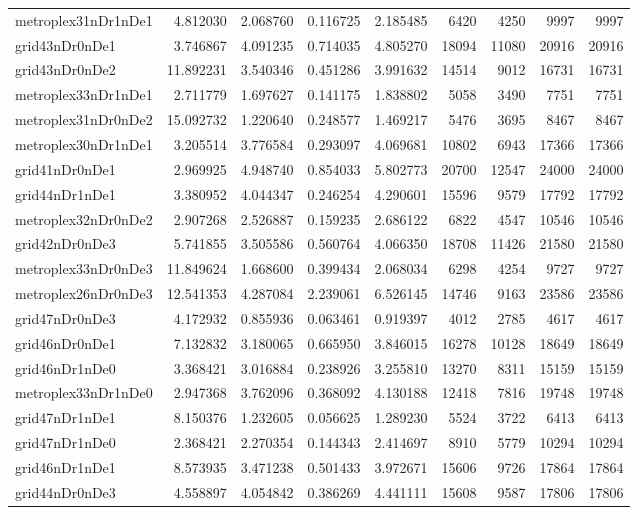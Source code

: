 \begin{longtable}{|l|r|r|r|r|r|r|r|r|}
metroplex31nDr1nDe1 & 4.812030 & 2.068760 & 0.116725 & 2.185485 & 6420 & 4250 & 9997 & 9997 \\
grid43nDr0nDe1 & 3.746867 & 4.091235 & 0.714035 & 4.805270 & 18094 & 11080 & 20916 & 20916 \\
grid43nDr0nDe2 & 11.892231 & 3.540346 & 0.451286 & 3.991632 & 14514 & 9012 & 16731 & 16731 \\
metroplex33nDr1nDe1 & 2.711779 & 1.697627 & 0.141175 & 1.838802 & 5058 & 3490 & 7751 & 7751 \\
metroplex31nDr0nDe2 & 15.092732 & 1.220640 & 0.248577 & 1.469217 & 5476 & 3695 & 8467 & 8467 \\
metroplex30nDr1nDe1 & 3.205514 & 3.776584 & 0.293097 & 4.069681 & 10802 & 6943 & 17366 & 17366 \\
grid41nDr0nDe1 & 2.969925 & 4.948740 & 0.854033 & 5.802773 & 20700 & 12547 & 24000 & 24000 \\
grid44nDr1nDe1 & 3.380952 & 4.044347 & 0.246254 & 4.290601 & 15596 & 9579 & 17792 & 17792 \\
metroplex32nDr0nDe2 & 2.907268 & 2.526887 & 0.159235 & 2.686122 & 6822 & 4547 & 10546 & 10546 \\
grid42nDr0nDe3 & 5.741855 & 3.505586 & 0.560764 & 4.066350 & 18708 & 11426 & 21580 & 21580 \\
metroplex33nDr0nDe3 & 11.849624 & 1.668600 & 0.399434 & 2.068034 & 6298 & 4254 & 9727 & 9727 \\
metroplex26nDr0nDe3 & 12.541353 & 4.287084 & 2.239061 & 6.526145 & 14746 & 9163 & 23586 & 23586 \\
grid47nDr0nDe3 & 4.172932 & 0.855936 & 0.063461 & 0.919397 & 4012 & 2785 & 4617 & 4617 \\
grid46nDr0nDe1 & 7.132832 & 3.180065 & 0.665950 & 3.846015 & 16278 & 10128 & 18649 & 18649 \\
grid46nDr1nDe0 & 3.368421 & 3.016884 & 0.238926 & 3.255810 & 13270 & 8311 & 15159 & 15159 \\
metroplex33nDr1nDe0 & 2.947368 & 3.762096 & 0.368092 & 4.130188 & 12418 & 7816 & 19748 & 19748 \\
grid47nDr1nDe1 & 8.150376 & 1.232605 & 0.056625 & 1.289230 & 5524 & 3722 & 6413 & 6413 \\
grid47nDr1nDe0 & 2.368421 & 2.270354 & 0.144343 & 2.414697 & 8910 & 5779 & 10294 & 10294 \\
grid46nDr1nDe1 & 8.573935 & 3.471238 & 0.501433 & 3.972671 & 15606 & 9726 & 17864 & 17864 \\
grid44nDr0nDe3 & 4.558897 & 4.054842 & 0.386269 & 4.441111 & 15608 & 9587 & 17806 & 17806 \\

\end{longtable}

